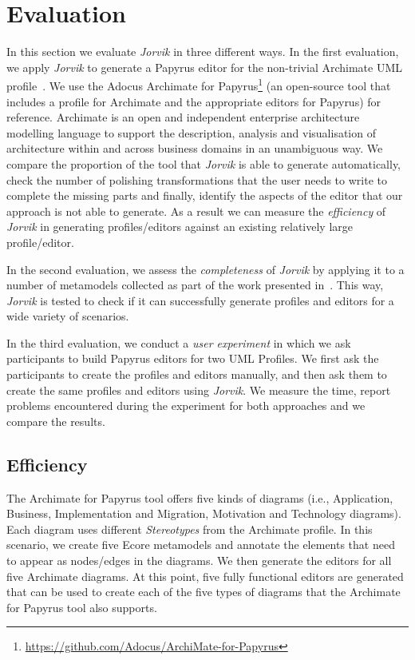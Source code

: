 \section{Evaluation}
\label{sec:evaluation}

In this section we evaluate \textit{Jorvik} in three different ways. 
In the first evaluation, we apply \textit{Jorvik} to generate a Papyrus editor for the non-trivial Archimate UML profile~\cite{iacob2009archimate,haren2012archimate}. 
We use the Adocus Archimate for Papyrus\footnote{\url{https://github.com/Adocus/ArchiMate-for-Papyrus}} (an open-source tool that includes a profile for Archimate and the appropriate editors for Papyrus) for reference. 
Archimate is an open and independent enterprise architecture modelling language to support the description, analysis and visualisation of architecture within and across business domains in an unambiguous way.
We compare the proportion of the tool that \textit{Jorvik} is able to generate automatically, check the number of polishing transformations that the user needs to write to complete the missing parts and finally, identify the aspects of the editor that our approach is not able to generate.
As a result we can measure the \textit{efficiency} of \textit{Jorvik} in generating profiles/editors against an existing relatively large profile/editor. 

In the second evaluation, we assess the \textit{completeness} of \textit{Jorvik} by applying it to a number of metamodels collected as part of the work presented in~\cite{williams2013metamodels}. 
This way, \textit{Jorvik} is tested to check if it can successfully generate profiles and editors for a wide variety of scenarios.

In the third evaluation, we conduct a \textit{user experiment} in which we ask participants to build Papyrus editors for two UML Profiles.
We first ask the participants to create the profiles and editors manually, and then ask them to create the same profiles and editors using \textit{Jorvik}. 
We measure the time, report problems encountered during the experiment for both approaches and we compare the results.

\subsection{Efficiency}
\label{sec:efficiencyEvaluation}
The Archimate for Papyrus tool offers five kinds of diagrams (i.e., Application, Business, Implementation and Migration, Motivation and Technology diagrams). 
Each diagram uses different \textit{Stereotypes} from the Archimate profile. 
In this scenario, we create five Ecore metamodels and annotate the elements that need to appear as nodes/edges in the diagrams. 
We then generate the editors for all five Archimate diagrams.
At this point, five fully functional editors are generated that can be used to create each of the five types of diagrams that the Archimate for Papyrus tool also supports. 

